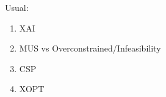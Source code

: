 Usual:
\begin{enumerate}
    \item XAI
    \item MUS vs Overconstrained/Infeasibility
    \item CSP
    \item XOPT
\end{enumerate}